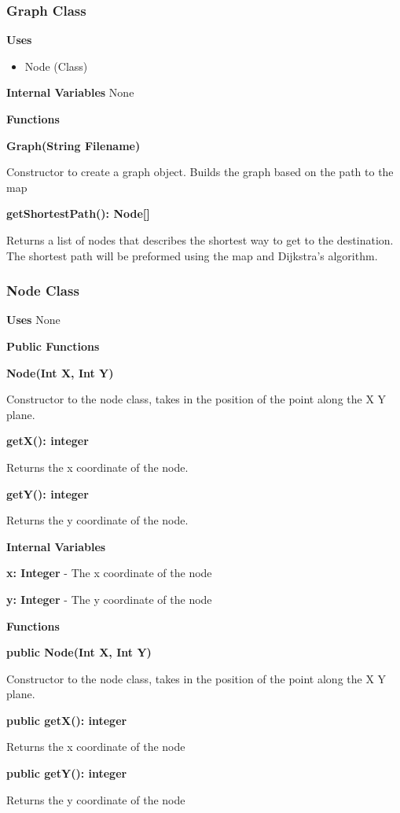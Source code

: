 \documentclass [10pt]{article}
\begin{document}
\subsubsection{Graph Class}
\textbf{Uses}
\begin{itemize}
	\item Node (Class)
\end{itemize}

\textbf{Internal Variables}
None 

\textbf{Functions}

\textbf{Graph(String Filename)}

Constructor to create a graph object. Builds the graph based on the path to the map

\textbf{getShortestPath(): Node[]}

Returns a list of nodes that describes the shortest way to get to the destination.  The shortest path will be preformed using the map and Dijkstra's algorithm.


\subsubsection{Node Class}
\textbf{Uses}
None 

\textbf{Public Functions}

\textbf{Node(Int X, Int Y)}

Constructor to the node class, takes in the position of the point along the X Y plane.

\textbf{getX(): integer}

Returns the x coordinate of the node.

\textbf{getY(): integer}

Returns the y coordinate of the node.

\textbf{Internal Variables}

\textbf{x: Integer} - The x coordinate of the node

\textbf{y: Integer} - The y coordinate of the node

\textbf{Functions}

\textbf{public Node(Int X, Int Y)}

Constructor to the node class, takes in the position of the point along the X Y plane.

\textbf{public getX(): integer}

Returns the x coordinate of the node

\textbf{public getY(): integer}

Returns the y coordinate of the node
\end{document}
